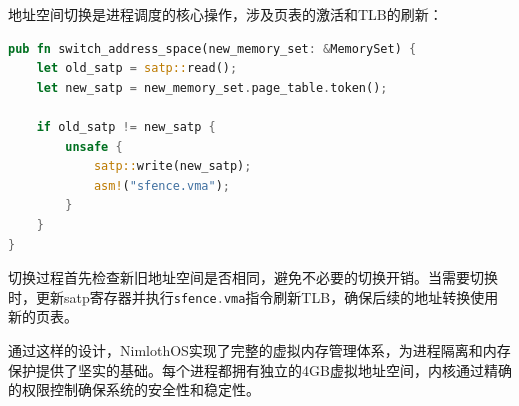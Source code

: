 地址空间切换是进程调度的核心操作，涉及页表的激活和TLB的刷新：

\begin{lstlisting}[language=Rust,caption={地址空间切换机制}, label={lst:address-space-switch}]
pub fn switch_address_space(new_memory_set: &MemorySet) {
    let old_satp = satp::read();
    let new_satp = new_memory_set.page_table.token();
    
    if old_satp != new_satp {
        unsafe {
            satp::write(new_satp);
            asm!("sfence.vma");
        }
    }
}
\end{lstlisting}

切换过程首先检查新旧地址空间是否相同，避免不必要的切换开销。当需要切换时，更新satp寄存器并执行\lstinline[language=Rust]{sfence.vma}指令刷新TLB，确保后续的地址转换使用新的页表。

通过这样的设计，NimlothOS实现了完整的虚拟内存管理体系，为进程隔离和内存保护提供了坚实的基础。每个进程都拥有独立的4GB虚拟地址空间，内核通过精确的权限控制确保系统的安全性和稳定性。